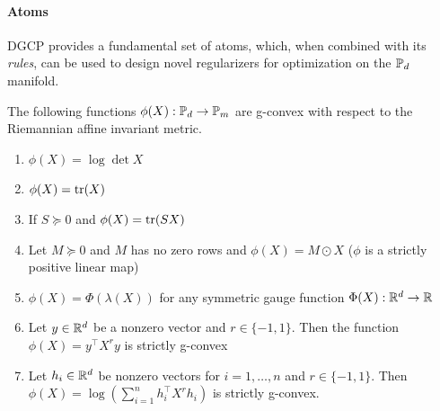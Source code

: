 \documentclass[sn-nature]{sn-jnl}%
\theoremstyle{thmstyleone}%
\theoremstyle{thmstyletwo}%
\theoremstyle{thmstylethree}%
\begin{document}
\paragraph{Atoms}
DGCP provides a fundamental set of atoms, which, when combined with its \textit{rules}, can be used to design novel regularizers for optimization on the $\mathbb{P}_d$ manifold. %

\begin{example}\label{example:g_cvx_atoms}
    The following functions $\phi(X): \mathbb{P}_d \to \mathbb{P}_m$ are g-convex with respect to the Riemannian affine invariant metric.
    \begin{enumerate}
    \item $\phi(X) = \log \det X$
        \item $\phi(X) = \text{tr}(X)$ 
        \item If $S \succeq 0$ and $\phi(X) = \text{tr}(SX)$
        
        \item Let $M \succeq 0$ and $M$ has no zero rows and $\phi(X) = M \odot X$ ($\phi$ is a strictly positive linear map)
        \item $\phi(X) = \Phi(\lambda(X))$ for any symmetric gauge function $\Phi(X): \mathbb{R}^d \to \mathbb{R}$
        \item Let $y \in \mathbb{R}^{d}$ be a nonzero vector and $r \in \{-1, 1\}$. Then the function $\phi(X) = y^\top X^r y$ is strictly g-convex
        \item Let $h_i \in \mathbb{R}^d$ be nonzero vectors for $i = 1, \ldots, n$ and $r \in \{-1, 1\}$. Then $\phi(X) = \log \left(\sum_{i=1}^n h_i^\top X^r h_i\right)$ is strictly g-convex.
    \end{enumerate}
\end{example}







\end{document}
